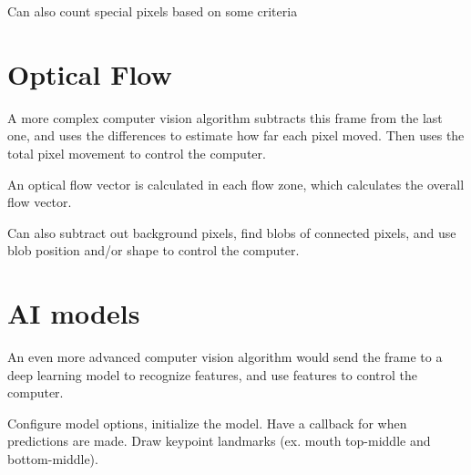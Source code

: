 \documentclass[11pt]{article}
\begin{document}
Can also count special pixels based on some criteria
\section{Optical Flow}
\label{sec:orgbdbd7ef}
A more complex computer vision algorithm subtracts this frame from the last one, and uses
the differences to estimate how far each pixel moved.
Then uses the total pixel movement to control the computer.

An optical flow vector is calculated in each flow zone, which calculates the overall
flow vector.

Can also subtract out background pixels, find blobs of connected pixels, and use blob
position and/or shape to control the computer.
\section{AI models}
\label{sec:orga96c769}
An even more advanced computer vision algorithm would send the frame to a deep learning
model to recognize features, and use features to control the computer.

Configure model options, initialize the model.
Have a callback for when predictions are made.
Draw keypoint landmarks (ex. mouth top-middle and bottom-middle).
\end{document}
